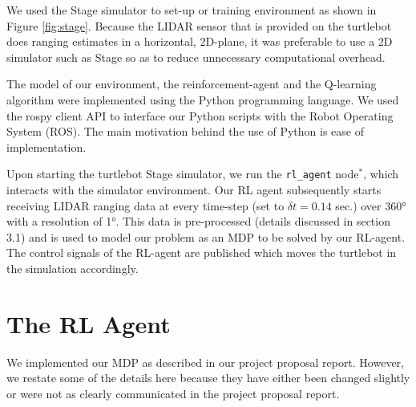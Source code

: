 \documentclass{article}
\begin{document}
We used the Stage simulator to set-up or training environment as shown in Figure \ref{fig:stage}. Because the LIDAR sensor that is provided on the turtlebot does ranging estimates in a horizontal, 2D-plane, it was preferable to use a 2D simulator such as Stage so as to reduce unnecessary computational overhead.

The model of our environment, the reinforcement-agent and the Q-learning algorithm were implemented using the Python programming language. We used the rospy client API to interface our Python scripts with the Robot Operating System (ROS). The main motivation behind the use of Python is ease of implementation.

Upon starting the turtlebot Stage simulator, we run the \texttt{rl\_agent} node$^\ast$, which interacts with the simulator environment. Our RL agent subsequently starts receiving LIDAR ranging data at every time-step (set to $\delta t = 0.14$ sec.) over \ang{360} with a resolution of \ang{1}. This data is pre-processed (details discussed in section 3.1) and is used to model our problem as an MDP to be solved by our RL-agent. The control signals of the RL-agent are published which moves the turtlebot in the simulation accordingly.


\section{The RL Agent}
We implemented our MDP as described in our project proposal report. However, we restate some of the details here because they have either been changed slightly or were not as clearly communicated in the project proposal report.
\end{document}
